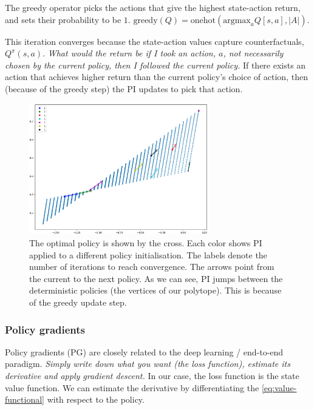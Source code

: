 The greedy operator picks the actions that give the highest state-action return,
and sets their probability to be $1$.
$\text{greedy}(Q) = \text{onehot}(\text{argmax}_a Q[s, a], |A|)$.

This iteration converges because the state-action values capture counterfactuals, $Q^{\pi}(s, a)$.
\textit{What would the return be if I took an action, $a$, not necessarily chosen by
the current policy, then I followed the current policy.}
If there exists an action that achieves higher return than the current policy's choice of action,
then (because of the greedy step) the PI updates to pick that action.

\begin{figure}[h!]
\centering
\includegraphics[width=0.7\textwidth,height=0.35\textheight]{../../pictures/figures/pi-polytope.png}
\caption{The optimal policy is shown by the cross.
Each color shows PI applied to a different policy initialisation.
The labels denote the number of iterations to reach convergence.
The arrows point from the current to the next policy. As we can see,
PI jumps between the deterministic policies (the vertices of our polytope).
This is because of the greedy update step.}
\end{figure}

\newpage
\subsubsection{Policy gradients}

Policy gradients (PG) are closely related to the deep learning / end-to-end paradigm.
\textit{Simply write down what you want (the loss function),
estimate its derivative and apply gradient descent.} In our case, the loss function
is the state value function. We can estimate the derivative
by differentiating the \ref{eq:value-functional} with respect to the policy.

